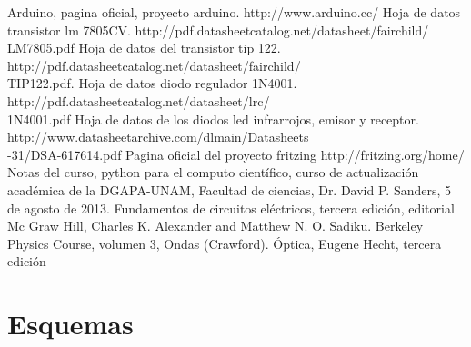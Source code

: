 \documentclass[12]{article}
\begin{document}
\begin{multicols}{2}
\begin{thebibliography}{99}
 Arduino, pagina oficial, proyecto arduino. http://www.arduino.cc/
 Hoja de datos  transistor lm 7805CV. http://pdf.datasheetcatalog.net/datasheet/fairchild/\\LM7805.pdf
 Hoja de datos del transistor tip 122. http://pdf.datasheetcatalog.net/datasheet/fairchild/\\TIP122.pdf.
  Hoja de datos diodo regulador 1N4001. http://pdf.datasheetcatalog.net/datasheet/lrc/\\1N4001.pdf
 Hoja de datos de los diodos led infrarrojos, emisor y receptor. \\ http://www.datasheetarchive.com/dlmain/Datasheets\\-31/DSA-617614.pdf
 Pagina oficial del proyecto fritzing http://fritzing.org/home/ 
 Notas del curso, python para el computo científico, curso de actualización académica de la DGAPA-UNAM, Facultad de ciencias, Dr. David P. Sanders, 5 de agosto de 2013. 
 Fundamentos de circuitos eléctricos, tercera edición, editorial Mc Graw Hill, Charles K. Alexander and Matthew N. O. Sadiku. 
 Berkeley Physics Course, volumen 3, Ondas (Crawford).
 Óptica, Eugene Hecht, tercera edición
\end{thebibliography}
\end{multicols}

{}
\appendix
\addappheadtotoc
\appendixpage

\section{Esquemas}
\end{document}
